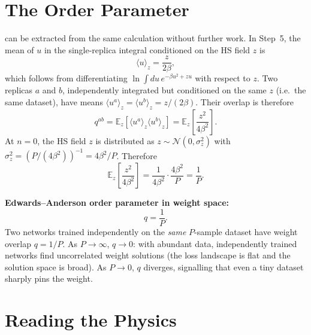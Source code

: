 \documentclass[nobib,justified]{tufte-handout}
\newcommand{\EE}{\mathbb{E}}
\begin{document}
\section{The Order Parameter}

 can be extracted from the same
calculation without further work.  In Step~5, the mean of $u$ in the
single-replica integral conditioned on the HS field $z$ is
\begin{equation}
  \langle u \rangle_{z} = \frac{z}{2\beta},
  \label{eq:umean}
\end{equation}
which follows from differentiating $\ln\int du\,e^{-\beta u^2+zu}$ with
respect to $z$.  Two replicas $a$ and $b$, independently integrated but
conditioned on the same $z$ (i.e.\ the same dataset), have means
$\langle u^a\rangle_z = \langle u^b\rangle_z = z/(2\beta)$.  Their
overlap is therefore
\begin{equation}
  q^{ab} = \EE_z\!\left[\langle u^a\rangle_z\langle u^b\rangle_z\right]
  = \EE_z\!\left[\frac{z^2}{4\beta^2}\right].
  \label{eq:qdef2}
\end{equation}
At $n=0$, the HS field $z$ is distributed as
$z\sim\mathcal{N}(0,\sigma_z^2)$ with
$\sigma_z^2 = (P/(4\beta^2))^{-1} = 4\beta^2/P$.  Therefore
\begin{equation}
  \EE_z\!\left[\frac{z^2}{4\beta^2}\right]
  = \frac{1}{4\beta^2}\cdot\frac{4\beta^2}{P}
  = \frac{1}{P}.
  \label{eq:qcompute}
\end{equation}

\begin{keyresult}
\textbf{Edwards--Anderson order parameter in weight space:}
\begin{equation*}
  q = \frac{1}{P}.
\end{equation*}
Two networks trained independently on the \emph{same} $P$-sample dataset
have weight overlap $q = 1/P$.
As $P\to\infty$, $q\to 0$: with abundant data, independently trained
networks find uncorrelated weight solutions (the loss landscape is flat
and the solution space is broad).  As $P\to 0$, $q$ diverges,
signalling that even a tiny dataset sharply pins the weight.
\end{keyresult}

\section{Reading the Physics}
\end{document}
